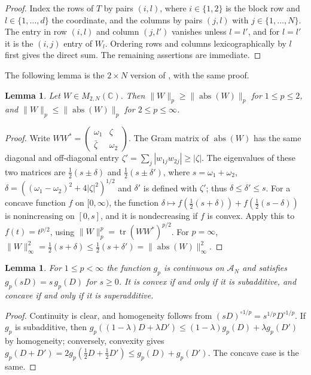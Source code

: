 \documentclass[11pt]{amsart}
\newtheorem{lemma}[theorem]{Lemma}
\theoremstyle{definition}
\theoremstyle{remark}
\numberwithin{equation}{section}
\newcommand{\C}{\mathbb{C}}
\newcommand{\tr}{\operatorname{tr}}
\newcommand{\abs}{\operatorname{abs}}
\newcommand{\cA}{\mathcal{A}}
\begin{document}
\begin{proof}
Index the rows of $T$ by pairs $(i,l)$, where $i\in\{1,2\}$ is the block row and $l\in\{1,\dots,d\}$ the coordinate, and the columns by pairs $(j,l)$ with $j\in\{1,\dots,N\}$. The entry in row $(i,l)$ and column $(j,l')$ vanishes unless $l=l'$, and for $l=l'$ it is the $(i,j)$ entry of $W_l$. Ordering rows and columns lexicographically by $l$ first gives the direct sum. The remaining assertions are immediate.
\end{proof}

The following lemma is the $2\times N$ version of \cite[Lemma~4]{KN04}, with the same proof.

\begin{lemma}\label{lem:phase}
Let $W\in M_{2,N}(\C)$. Then $\|W\|_p\ge\|\abs(W)\|_p$ for $1\le p\le2$, and $\|W\|_p\le\|\abs(W)\|_p$ for $2\le p\le\infty$.
\end{lemma}

\begin{proof}
Write $WW^*=\begin{pmatrix}\omega_1&\zeta\\ \bar\zeta&\omega_2\end{pmatrix}$. The Gram matrix of $\abs(W)$ has the same diagonal and off-diagonal entry $\zeta'=\sum_j|w_{1j}w_{2j}|\ge|\zeta|$. The eigenvalues of these two matrices are $\frac12(s\pm\delta)$ and $\frac12(s\pm\delta')$, where $s=\omega_1+\omega_2$, $\delta=((\omega_1-\omega_2)^2+4|\zeta|^2)^{1/2}$ and $\delta'$ is defined with $\zeta'$; thus $\delta\le\delta'\le s$. For a concave function $f$ on $[0,\infty)$, the function $\delta\mapsto f(\frac12(s+\delta))+f(\frac12(s-\delta))$ is nonincreasing on $[0,s]$, and it is nondecreasing if $f$ is convex. Apply this to $f(t)=t^{p/2}$, using $\|W\|_p^p=\tr (WW^*)^{p/2}$. For $p=\infty$, $\|W\|_\infty^2=\frac12(s+\delta)\le\frac12(s+\delta')=\|\abs(W)\|_\infty^2$.
\end{proof}

\begin{lemma}\label{lem:homog}
For $1\le p<\infty$ the function $g_p$ is continuous on $\cA_N$ and satisfies $g_p(sD)=s\,g_p(D)$ for $s\ge0$. It is convex if and only if it is subadditive, and concave if and only if it is superadditive.
\end{lemma}

\begin{proof}
Continuity is clear, and homogeneity follows from $(sD)^{\circ1/p}=s^{1/p}D^{\circ1/p}$. If $g_p$ is subadditive, then $g_p((1-\lambda)D+\lambda D')\le(1-\lambda)g_p(D)+\lambda g_p(D')$ by homogeneity; conversely, convexity gives $g_p(D+D')=2g_p(\frac12D+\frac12D')\le g_p(D)+g_p(D')$. The concave case is the same.
\end{proof}
\end{document}
